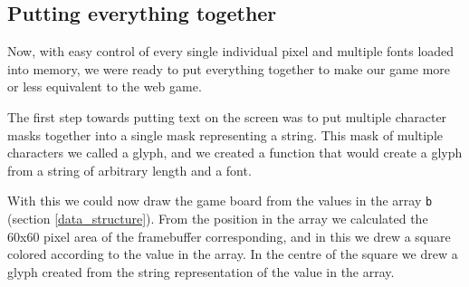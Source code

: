 \subsection{Putting everything together}
Now, with easy control of every single individual pixel and multiple fonts loaded into memory, we were ready to put everything together to make our game more or less equivalent to the web game.

The first step towards putting text on the screen was to put multiple character masks together into a single mask representing a string.
This mask of multiple characters we called a glyph, and we created a function that would create a glyph from a string of arbitrary length and a font.



With this we could now draw the game board from the values in the array \texttt{b} (section \ref{data_structure}).
From the position in the array we calculated the 60x60 pixel area of the framebuffer corresponding, and in this we drew a square colored according to the value in the array.
In the centre of the square we drew a glyph created from the string representation of the value in the array.


